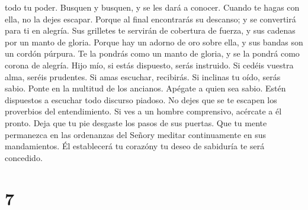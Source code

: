 todo tu poder.  Busquen y busquen, y se les dará a
conocer. Cuando te hagas con ella, no la dejes escapar. 
Porque al final encontrarás su descanso; y se convertirá para ti en
alegría.  Sus grilletes te servirán de cobertura de
fuerza, y sus cadenas por un manto de gloria.  Porque hay
un adorno de oro sobre ella, y sus bandas son un cordón púrpura.
 Te la pondrás como un manto de gloria, y se la pondrá
como corona de alegría.  Hijo mío, si estás dispuesto,
serás instruido. Si cedéis vuestra alma, seréis prudentes.
 Si amas escuchar, recibirás. Si inclinas tu oído, serás
sabio.  Ponte en la multitud de los ancianos. Apégate a
quien sea sabio.  Estén dispuestos a escuchar todo
discurso piadoso. No dejes que se te escapen los proverbios del
entendimiento.  Si ves a un hombre comprensivo, acércate
a él pronto. Deja que tu pie desgaste los pasos de sus puertas.
 Que tu mente permanezca en las ordenanzas del Señory
meditar continuamente en sus mandamientos. Él establecerá tu corazóny tu
deseo de sabiduría te será concedido.

\hypertarget{section-6}{%
\section{7}\label{section-6}}

